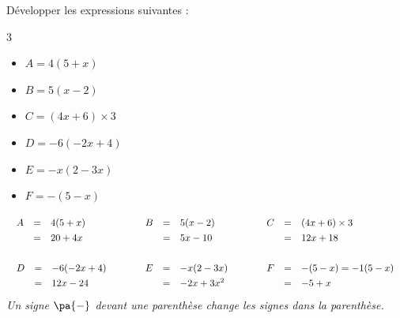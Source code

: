 \begin{methode}
	Développer les expressions suivantes :
	\begin{multicols}{3}
		\begin{itemize}
			\item $A = 4(5 + x)$
			\item $B = 5(x - 2)$
			\item $C = (4x + 6) \times 3$
			\item $D = -6(-2x + 4)$
			\item $E = -x(2 - 3x)$
			\item $F = -(5 - x)$
		\end{itemize}
	\end{multicols}

	\begin{correction}
		\[
			\begin{array}{lll}%
				\def\arraystretch{1.3}%
				\begin{array}{rcl}%
					A & = & 4(5 + x) \\
					  & = & 20 + 4x  \\
				\end{array} \quad  & \quad  %
				\def\arraystretch{1.3}%
				\begin{array}{rcl}%
					B & = & 5(x - 2) \\
					  & = & 5x - 10  \\
				\end{array} \quad  & \quad  %
				\def\arraystretch{1.3}%
				\begin{array}{rcl}%
					C & = & (4x + 6) \times 3 \\
					  & = & 12x + 18          \\
				\end{array} \\&&\\%
				\def\arraystretch{1.3}%
				\begin{array}{rcl}%
					D & = & -6(-2x + 4) \\
					  & = & 12x - 24    \\
				\end{array} \quad & \quad %
				\def\arraystretch{1.3}%
				\begin{array}{rcl}%
					E & = & -x(2 - 3x) \\
					  & = & -2x + 3x^2 \\
				\end{array} \quad & \quad %
				\def\arraystretch{1.3}%
				\begin{array}{rcl}%
					F & = & -(5 - x) = -1(5 - x) \\
					  & = & -5 + x               \\
				\end{array}%
			\end{array}%
		\]
		\textit{Un signe $\pa{-}$ devant une parenthèse change les signes dans la parenthèse.}
	\end{correction}
\end{methode}

